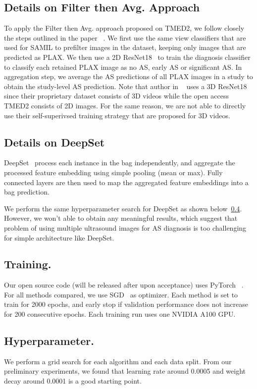 \subsection{Details on Filter then Avg. Approach}
\label{App:Filter then Avg.}
To apply the Filter then Avg. approach proposed on TMED2, we follow closely the steps outlined in the paper ~\citet{holste2022automated,holste2022self}. We first use the same view classifiers that are used for SAMIL to prefilter images in the dataset, keeping only images that are predicted as PLAX. We then use a 2D ResNet18~\citep{he2016deep} to train the diagnosis classifier to classify each retained PLAX image as no AS, early AS or significant AS. In aggregation step, we average the AS predictions of all PLAX images in a study to obtain the study-level AS prediction. Note that author in ~\citep{holste2022self} uses a 3D ResNet18~\citep{tran2018closer} since their proprietary dataset consists of 3D videos while the open access TMED2 consists of 2D images. For the same reason, we are not able to directly use their self-superivsed training strategy that are proposed for 3D videos.

\subsection{Details on DeepSet}
\label{App:DeepSet}
DeepSet~\citep{zaheer2017deep} process each instance in the bag independently, and aggregate the processed feature embedding using simple pooling (mean or max). Fully connected layers are then used to map the aggregated feature embeddings into a bag prediction.

We perform the same hyperparameter search for DeepSet as shown below~\ref{App:Hyper}. However, we won't able to obtain any meaningful results, which suggest that problem of using multiple ultrasound images for AS diagnosis is too challenging for simple architecture like DeepSet.

\subsection{Training.} Our open source code (will be released after upon acceptance) uses PyTorch ~\citep{paszke2019pytorch}. For all methods compared, we use SGD~\citep{robbins1951stochastic} as optimizer. Each method is set to train for 2000 epochs, and early stop if validation performance does not increase for 200 consecutive epochs. Each training run uses one NVIDIA A100 GPU.

\subsection{Hyperparameter.} 
\label{App:Hyper}
We perform a grid search for each algorithm and each data split. From our preliminary experiments, we found that learning rate around 0.0005 and weight decay around 0.0001 is a good starting point. 

